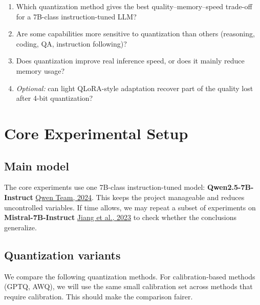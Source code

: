 \documentclass[11pt,a4paper]{article}
\newcommand{\cit}[2]{\href{https://arxiv.org/abs/#2}{#1}}
\begin{document}
\begin{enumerate}
    \item Which quantization method gives the best quality--memory--speed trade-off for a 7B-class instruction-tuned LLM?
    \item Are some capabilities more sensitive to quantization than others (reasoning, coding, QA, instruction following)?
    \item Does quantization improve real inference speed, or does it mainly reduce memory usage?
    \item \emph{Optional:} can light QLoRA-style adaptation recover part of the quality lost after 4-bit quantization?
\end{enumerate}

\section{Core Experimental Setup}

\subsection{Main model}
The core experiments use one 7B-class instruction-tuned model:
\textbf{Qwen2.5-7B-Instruct} \cit{Qwen Team, 2024}{2412.15115}.
This keeps the project manageable and reduces uncontrolled variables. If time allows, we may repeat a subset of experiments on \textbf{Mistral-7B-Instruct} \cit{Jiang et al., 2023}{2310.06825} to check whether the conclusions generalize.

\subsection{Quantization variants}
We compare the following quantization methods. For calibration-based methods (GPTQ, AWQ), we will use the same small calibration set across methods that require calibration. This should make the comparison fairer.
\end{document}
